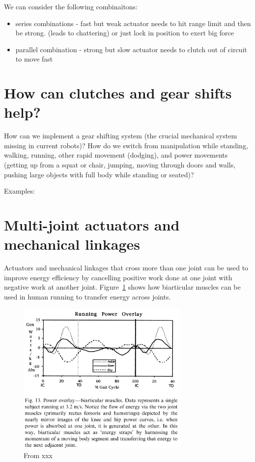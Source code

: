 \documentclass[letterpaper,12pt,fullpage]{article}
\begin{document}
We can consider the following combinaitons:
\begin{itemize}
\item
series combinations - fast but weak actuator needs to hit range limit and then be strong. (leads to chattering) or just lock in position to exert big force
\item
parallel combination - strong but slow actuator needs to clutch out of circuit to move fast
\end{itemize}

\section{How can clutches and gear shifts help?}

How can we implement a gear shifting system (the crucial mechanical
system missing in current robots)? How do we switch from manipulation
while standing, walking, running, other rapid movement (dodging), and
power movements (getting up from a squat or chair,
jumping, moving through doors and walls, pushing large objects
with full body while standing or seated)?

Examples:~\cite{IEEE07222598}

\section{Multi-joint actuators and mechanical linkages}

Actuators and mechanical linkages that cross more than one joint
can be used to improve energy efficiency by cancelling positive
work done at one joint with negative work at another joint.
Figure~\ref{f:hip-knee} shows how biarticular muscles can be used
in human running to transfer energy across joints.

\begin{figure}[t]
\centering
\includegraphics[width=0.75\textwidth]{figs/shc1}
\caption{From xxx}
\label{f:hip-knee}
\end{figure}
\end{document}
